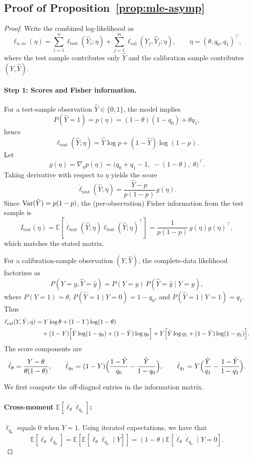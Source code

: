 \subsection{Proof of Proposition~\ref{prop:mle-asymp}}
\begin{proof}
Write the combined log-likelihood as
\[
\ell_{n,m}(\eta)
=
\sum_{i=1}^n \ell_{\mathrm{test}}(\hat Y_i;\eta)
+
\sum_{j=1}^m \ell_{\mathrm{cal}}(Y_j,\hat Y_j;\eta),
\qquad
\eta=(\theta,q_0,q_1)^\top,
\]
where the test sample contributes only $\hat Y$ and the calibration sample contributes $(Y,\hat Y)$.

\paragraph{Step 1: Scores and Fisher information.}
For a test-sample observation $\hat Y\in\{0,1\}$, the model implies
\[
P(\hat Y=1)=p(\eta)=(1-\theta)(1-q_0)+\theta q_1,
\]
hence
\[
\ell_{\mathrm{test}}(\hat Y;\eta)=\hat Y\log p+(1-\hat Y)\log(1-p).
\]
Let
\[
g(\eta)=\nabla_\eta p(\eta)=\bigl(q_0+q_1-1,\;-(1-\theta),\;\theta\bigr)^\top.
\]
Taking derivative with respect to $\eta$ yields the score
\[
\dot\ell_{\mathrm{test}}(\hat Y;\eta)
=
\frac{\hat Y-p}{p(1-p)}\,g(\eta).
\]
Since $\mathrm{Var}(\hat Y)=p(1-p)$, the (per-observation) Fisher information from the test sample is
\[
I_{\mathrm{test}}(\eta)
=
\mathbb E\!\left[\dot\ell_{\mathrm{test}}(\hat Y;\eta)\dot\ell_{\mathrm{test}}(\hat Y;\eta)^\top\right]
=
\frac{1}{p(1-p)}\,g(\eta)g(\eta)^\top,
\]
which matches the stated matrix.

For a calibration-sample observation $(Y,\hat Y)$, the complete-data likelihood factorizes as
\[
P(Y=y,\hat Y=\hat y)
=
P(Y=y)\,P(\hat Y=\hat y\mid Y=y),
\]
where $P(Y=1)=\theta$, $P(\hat Y=1\mid Y=0)=1-q_0$, and $P(\hat Y=1\mid Y=1)=q_1$.
Thus
\begin{align*}
\ell_{\mathrm{cal}}(Y,\hat Y;\eta)
&=
Y\log\theta+(1-Y)\log(1-\theta) \\
&\quad+(1-Y)\Bigl[\hat Y\log(1-q_0)+(1-\hat Y)\log q_0\Bigr]
+Y\Bigl[\hat Y\log q_1+(1-\hat Y)\log(1-q_1)\Bigr].
\end{align*}
The score components are
\[
\dot\ell_{\theta}=\frac{Y-\theta}{\theta(1-\theta)},\qquad
\dot\ell_{q_0}=(1-Y)\Bigl(\frac{1-\hat Y}{q_0}-\frac{\hat Y}{1-q_0}\Bigr),\qquad
\dot\ell_{q_1}=Y\Bigl(\frac{\hat Y}{q_1}-\frac{1-\hat Y}{1-q_1}\Bigr).
\]

 We first compute the off-diagnol entries in the information matrix. 

\paragraph{Cross-moment $\mathbb{E}[\dot\ell_\theta \dot\ell_{q_0}]$:}
   $\dot\ell_{q_0}$ equals 0 when $Y=1$. Using iterated expectations, we have that
  $$\mathbb{E}[\dot\ell_\theta \dot\ell_{q_0}] = \mathbb{E}[\mathbb{E}[\dot\ell_\theta \dot\ell_{q_0} \mid Y]] = (1-\theta)\mathbb{E}[\dot\ell_\theta \dot\ell_{q_0} \mid Y=0].$$


\end{proof}
